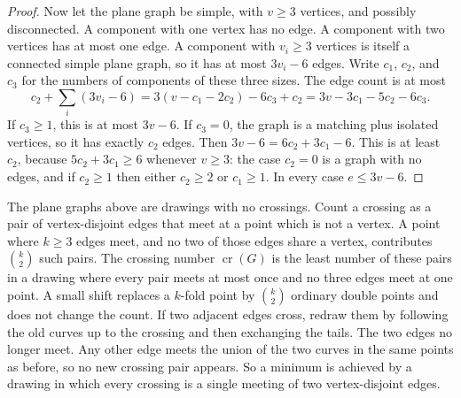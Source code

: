 \begin{proof}
Now let the plane graph be simple, with $v\ge3$ vertices, and possibly disconnected. A component with one vertex has no edge. A component with two vertices has at most one edge. A component with $v_i\ge3$ vertices is itself a connected simple plane graph, so it has at most $3v_i-6$ edges. Write $c_1$, $c_2$, and $c_3$ for the numbers of components of these three sizes. The edge count is at most
\[
 c_2+\sum_i(3v_i-6)=3(v-c_1-2c_2)-6c_3+c_2=3v-3c_1-5c_2-6c_3.
\]
If $c_3\ge1$, this is at most $3v-6$. If $c_3=0$, the graph is a matching plus isolated vertices, so it has exactly $c_2$ edges. Then $3v-6=6c_2+3c_1-6$. This is at least $c_2$, because $5c_2+3c_1\ge6$ whenever $v\ge3$: the case $c_2=0$ is a graph with no edges, and if $c_2\ge1$ then either $c_2\ge2$ or $c_1\ge1$. In every case $e\le 3v-6$.
\end{proof}

The plane graphs above are drawings with no crossings. Count a crossing as a pair of vertex-disjoint edges that meet at a point which is not a vertex. A point where $k\ge3$ edges meet, and no two of those edges share a vertex, contributes $\binom{k}{2}$ such pairs. The crossing number $\operatorname{cr}(G)$ is the least number of these pairs in a drawing where every pair meets at most once and no three edges meet at one point. A small shift replaces a $k$-fold point by $\binom{k}{2}$ ordinary double points and does not change the count. If two adjacent edges cross, redraw them by following the old curves up to the crossing and then exchanging the tails. The two edges no longer meet. Any other edge meets the union of the two curves in the same points as before, so no new crossing pair appears. So a minimum is achieved by a drawing in which every crossing is a single meeting of two vertex-disjoint edges.

